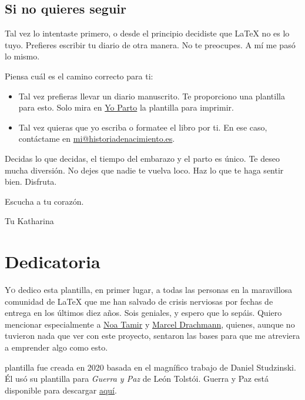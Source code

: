 \section{Si no quieres seguir}
Tal vez lo intentaste primero, o desde el principio decidiste que \LaTeX{} no es lo tuyo. Prefieres escribir tu diario de otra manera. No te preocupes. A mí me pasó lo mismo. \newline

Piensa cuál es el camino correcto para ti:
\begin{itemize}
    \item Tal vez prefieras llevar un diario manuscrito. Te proporciono una plantilla para esto. Solo mira en \href{www.yoparto.com/diariodeembarazo}{Yo Parto} la plantilla para imprimir.
    \item Tal vez quieras que yo escriba o formatee el libro por ti. En ese caso, contáctame en \href{mailto:mi@historiadenacimiento.es}{mi@historiadenacimiento.es}.
\end{itemize}

Decidas lo que decidas, el tiempo del embarazo y el parto es único. Te deseo mucha diversión. No dejes que nadie te vuelva loco. Haz lo que te haga sentir bien. Disfruta. \newline

Escucha a tu corazón. \newline

{\LARGE{\calli Tu Katharina}}

\chapter*{Dedicatoria}

\lettrine[lines=2, loversize=0.3, lraise=0]{\initfamily Y}{o} dedico esta plantilla, en primer lugar, a todas las personas en la maravillosa comunidad de LaTeX que me han salvado de crisis nerviosas por fechas de entrega en los últimos diez años. Sois geniales, y espero que lo sepáis. Quiero mencionar especialmente a \href{http://www.noatamir.com/}{Noa Tamir} y \href{https://www.zib.de/de/members/drachmann}{Marcel Drachmann}, quienes, aunque no tuvieron nada que ver con este proyecto, sentaron las bases para que me atreviera a emprender algo como esto.

 plantilla fue creada en 2020 basada en el magnífico trabajo de Daniel Studzinski. Él usó su plantilla para \emph{Guerra y Paz} de León Tolstói. Guerra y Paz está disponible para descargar \href{https://www.overleaf.com/articles/war-and-peace/kdgcwgqzrrfd}{aquí}.
